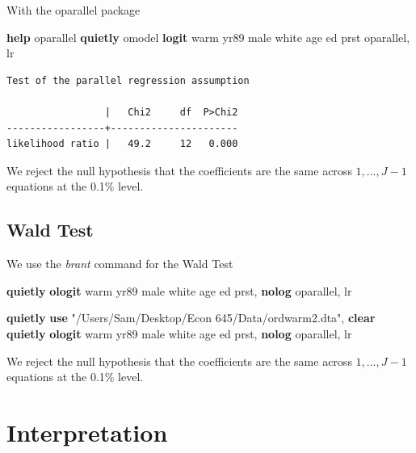 \documentclass[
]{book}
\newenvironment{Shaded}{\begin{snugshade}}{\end{snugshade}}
\newcommand{\BaseNTok}[1]{\textcolor[rgb]{0.00,0.00,0.81}{#1}}
\newcommand{\KeywordTok}[1]{\textcolor[rgb]{0.13,0.29,0.53}{\textbf{#1}}}
\newcommand{\NormalTok}[1]{#1}
\newcommand{\StringTok}[1]{\textcolor[rgb]{0.31,0.60,0.02}{#1}}
\begin{document}
With the oparallel package

\begin{Shaded}
\begin{Highlighting}[]
\KeywordTok{help}\NormalTok{ oparallel}
\KeywordTok{quietly}\NormalTok{ omodel }\KeywordTok{logit}\NormalTok{ warm yr89 male }\BaseNTok{white}\NormalTok{ age ed prst}
\NormalTok{oparallel, lr}
\end{Highlighting}
\end{Shaded}

\begin{verbatim}
Test of the parallel regression assumption

                 |   Chi2     df  P>Chi2
-----------------+----------------------
likelihood ratio |   49.2     12   0.000
\end{verbatim}

We reject the null hypothesis that the coefficients are the same across \(1,...,J-1\) equations at the 0.1\% level.

\subsection{Wald Test}\label{wald-test}

We use the \emph{brant} command for the Wald Test

\begin{Shaded}
\begin{Highlighting}[]
\KeywordTok{quietly} \KeywordTok{ologit}\NormalTok{ warm yr89 male }\BaseNTok{white}\NormalTok{ age ed prst, }\KeywordTok{nolog}
\NormalTok{oparallel, lr}
\end{Highlighting}
\end{Shaded}

\begin{Shaded}
\begin{Highlighting}[]
\KeywordTok{quietly} \KeywordTok{use} \StringTok{"/Users/Sam/Desktop/Econ 645/Data/ordwarm2.dta"}\NormalTok{, }\KeywordTok{clear}
\KeywordTok{quietly} \KeywordTok{ologit}\NormalTok{ warm yr89 male }\BaseNTok{white}\NormalTok{ age ed prst, }\KeywordTok{nolog}
\NormalTok{oparallel, lr}
\end{Highlighting}
\end{Shaded}

We reject the null hypothesis that the coefficients are the same across \(1,...,J-1\) equations at the 0.1\% level.

\section{Interpretation}\label{interpretation}
\end{document}
